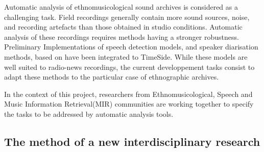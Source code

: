 \documentclass{sig-alternate}
\begin{document}
Automatic analysis of ethnomusicological sound archives is considered as a challenging task.
Field recordings generally contain more sound sources, noise, and recording artefacts than those obtained in studio conditions.
Automatic analysis of these recordings requires methods having a stronger robustness.
Preliminary Implementations  of speech detection models, and speaker diarisation methods, based on  \cite{barras2006multistage} have been integrated to TimeSide. 
While these models are well suited to radio-news recordings, the current developpement tasks consist to adapt these methods to the particular case of ethnographic archives.

In the context of this project, researchers from Ethnomusicological, Speech and Music Information Retrieval(MIR) communities are working together to specify the tasks to be addressed by automatic analysis tools.


\subsection{The method of a new interdisciplinary research}
\end{document}
